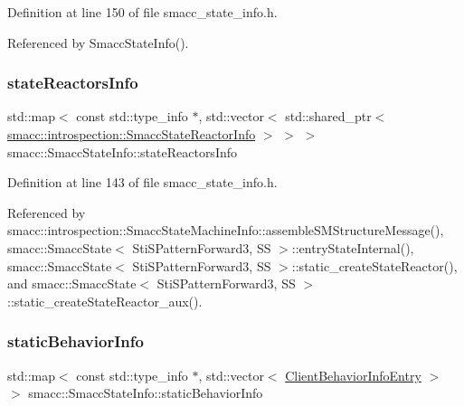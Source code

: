 Definition at line 150 of file smacc\+\_\+state\+\_\+info.\+h.



Referenced by Smacc\+State\+Info().

\mbox{\label{classsmacc_1_1introspection_1_1SmaccStateInfo_abd1d6ca5060c87f6bd11fde3e5b2ac4d}} 
\subsubsection{\texorpdfstring{state\+Reactors\+Info}{stateReactorsInfo}}
{\footnotesize\ttfamily std\+::map$<$ const std\+::type\+\_\+info $\ast$, std\+::vector$<$ std\+::shared\+\_\+ptr$<$ \hyperlink{structsmacc_1_1introspection_1_1SmaccStateReactorInfo}{smacc\+::introspection\+::\+Smacc\+State\+Reactor\+Info} $>$ $>$ $>$ smacc\+::\+Smacc\+State\+Info\+::state\+Reactors\+Info\hspace{0.3cm}{\ttfamily [static]}}



Definition at line 143 of file smacc\+\_\+state\+\_\+info.\+h.



Referenced by smacc\+::introspection\+::\+Smacc\+State\+Machine\+Info\+::assemble\+S\+M\+Structure\+Message(), smacc\+::\+Smacc\+State$<$ Sti\+S\+Pattern\+Forward3, S\+S $>$\+::entry\+State\+Internal(), smacc\+::\+Smacc\+State$<$ Sti\+S\+Pattern\+Forward3, S\+S $>$\+::static\+\_\+create\+State\+Reactor(), and smacc\+::\+Smacc\+State$<$ Sti\+S\+Pattern\+Forward3, S\+S $>$\+::static\+\_\+create\+State\+Reactor\+\_\+aux().

\mbox{\label{classsmacc_1_1introspection_1_1SmaccStateInfo_ad3d8b3450060cb0b91f38fb2fe0a7678}} 
\subsubsection{\texorpdfstring{static\+Behavior\+Info}{staticBehaviorInfo}}
{\footnotesize\ttfamily std\+::map$<$ const std\+::type\+\_\+info $\ast$, std\+::vector$<$ \hyperlink{structsmacc_1_1introspection_1_1ClientBehaviorInfoEntry}{Client\+Behavior\+Info\+Entry} $>$ $>$ smacc\+::\+Smacc\+State\+Info\+::static\+Behavior\+Info\hspace{0.3cm}{\ttfamily [static]}}



